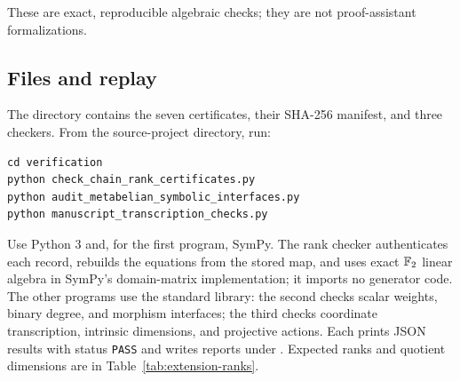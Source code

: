 These are exact, reproducible algebraic checks; they are not
proof-assistant formalizations.

\subsection{Files and replay}

The  directory contains the seven certificates,
their SHA-256 manifest, and three checkers. From the source-project
directory, run:
\begin{verbatim}
cd verification
python check_chain_rank_certificates.py
python audit_metabelian_symbolic_interfaces.py
python manuscript_transcription_checks.py
\end{verbatim}
Use Python 3 and, for the first program, SymPy. The rank checker
authenticates each record, rebuilds the equations from the stored map,
and uses exact \(\mathbb F_2\) linear algebra in SymPy's domain-matrix
implementation; it imports no generator code. The other programs use
the standard library: the second checks scalar weights, binary degree,
and morphism interfaces; the third checks coordinate transcription,
intrinsic dimensions, and projective actions. Each prints JSON results
with status \texttt{PASS} and writes reports under .
Expected ranks and quotient dimensions are in
Table~\ref{tab:extension-ranks}.
